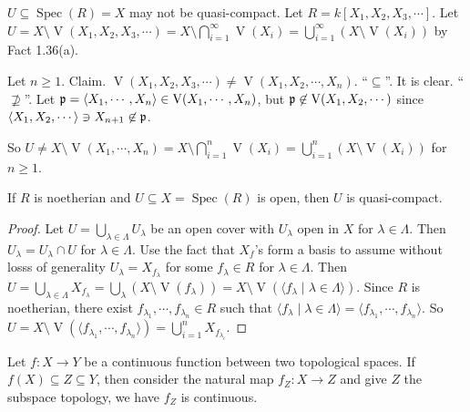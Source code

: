 \begin{example*}
    $U \subseteq \operatorname{Spec}(R) = X$ may not be quasi-compact. Let $R = k[X_1,X_2,X_3,\cdots]$. Let $U = X \setminus \operatorname{V}(X_1,X_2,X_3,\cdots) = X \setminus \bigcap_{i=1}^{\infty} \operatorname{V}(X_i) = \bigcup_{i=1}^\infty (X \setminus \operatorname{V}(X_i))$ by Fact 1.36(a). \par 
    Let $n \geq 1$. Claim. $\operatorname{V}(X_1,X_2,X_3,\cdots) \neq \operatorname{V}(X_1,X_2,\cdots,X_n)$. ``$\subseteq$''. It is clear. ``$\not \supseteq$''. Let $\mathfrak{p} = \langle X_1,\cdots,X_n \rangle \in \operatorname{V}(X_1,\cdots,X_n)$, but $\mathfrak{p} \not \in \operatorname{V}(X_1,X_2,\cdots)$ since $\langle X_1,X_2,\cdots \rangle\ni X_{n+1} \not \in \mathfrak{p}$. \par 
    So $U \neq X \setminus \operatorname{V}(X_1,\cdots,X_n) = X \setminus \bigcap_{i=1}^{n} \operatorname{V}(X_i) = \bigcup_{i=1}^n (X \setminus \operatorname{V}(X_i))$ for $n \geq 1$. 
\end{example*}

\begin{fact*}
    If $R$ is noetherian and $U \subseteq X = \operatorname{Spec}(R)$ is open, then $U$ is quasi-compact. 
\end{fact*}

\begin{proof}
    Let $U = \bigcup_{\lambda \in \Lambda}U_\lambda$ be an open cover with $U_\lambda$ open in $X$ for $\lambda \in \Lambda$. Then $U_\lambda = U_\lambda \cap U$ for $\lambda \in \Lambda$. Use the fact that $X_f$'s form a basis to assume without losss of generality $U_\lambda = X_{f_\lambda}$ for some $f_\lambda \in R$ for $\lambda \in \Lambda$. Then $U = \bigcup_{\lambda \in \Lambda} X_{f_\lambda} = \bigcup_\lambda (X \setminus \operatorname{V}(f_\lambda)) = X \setminus \operatorname{V}(\langle f_\lambda \mid \lambda \in \Lambda \rangle)$. Since $R$ is noetherian, there exist $f_{\lambda_1},\cdots,f_{\lambda_n} \in R$ such that $\langle f_\lambda \mid \lambda \in \Lambda \rangle = \langle f_{\lambda_1},\cdots,f_{\lambda_n} \rangle$. So $U = X \setminus \operatorname{V}(\langle f_{\lambda_1},\cdots,f_{\lambda_n} \rangle) = \bigcup_{i=1}^n X_{f_{\lambda_i}}$. 
\end{proof}

\begin{lemma}
    Let $f: X \to Y$ be a continuous function between two topological spaces. If $f(X) \subseteq Z \subseteq Y$, then consider the natural map $f_Z: X \to Z$ and give $Z$ the subspace topology, we have $f_Z$ is continuous.
\end{lemma}


